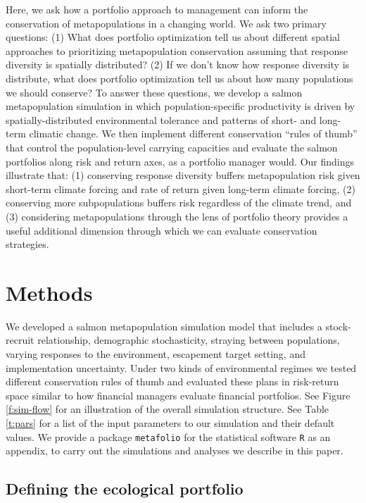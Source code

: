 Here, we ask how a portfolio approach to management can inform the
conservation of metapopulations in a changing world. We ask two primary
questions: (1) What does portfolio optimization tell us about different
spatial approaches to prioritizing metapopulation conservation assuming
that response diversity is spatially distributed? (2) If we don't know
how response diversity is distribute, what does portfolio optimization
tell us about how many populations we should conserve? To answer these
questions, we develop a salmon metapopulation simulation in which
population-specific productivity is driven by spatially-distributed
environmental tolerance and patterns of short- and long-term climatic
change. We then implement different conservation ``rules of thumb'' that
control the population-level carrying capacities and evaluate the salmon
portfolios along risk and return axes, as a portfolio manager would. Our
findings illustrate that: (1) conserving response diversity buffers
metapopulation risk given short-term climate forcing and rate of return
given long-term climate forcing, (2) conserving more subpopulations
buffers risk regardless of the climate trend, and (3) considering
metapopulations through the lens of portfolio theory provides a useful
additional dimension through which we can evaluate conservation
strategies.

\section{Methods}

We developed a salmon metapopulation simulation model that includes a
stock-recruit relationship, demographic stochasticity, straying between
populations, varying responses to the environment, escapement target
setting, and implementation uncertainty. Under two kinds of
environmental regimes we tested different conservation rules of thumb
and evaluated these plans in risk-return space similar to how financial
managers evaluate financial portfolios. See Figure \ref{f:sim-flow} for
an illustration of the overall simulation structure. See Table
\ref{t:pars} for a list of the input parameters to our simulation and
their default values. We provide a package \texttt{metafolio} for the
statistical software \texttt{R} \citep{r2013} as an appendix, to carry
out the simulations and analyses we describe in this paper.

\subsection{Defining the ecological portfolio}


